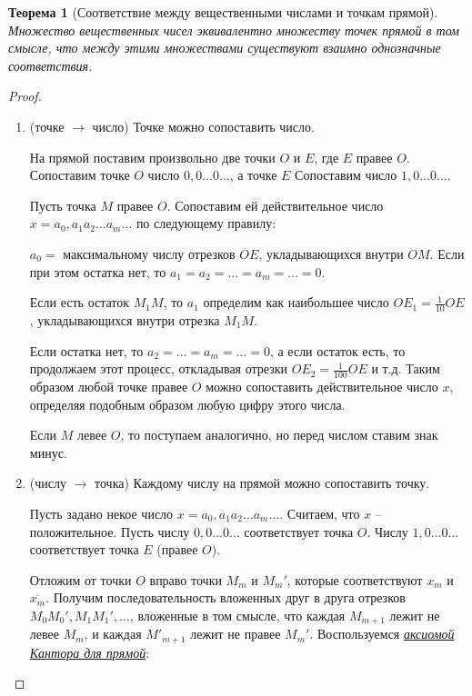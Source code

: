\documentclass[a4paper,oneside]{article}
\newtheorem{theorem}{Теорема}[subsection]
\theoremstyle{definition}
\theoremstyle{definition}
\theoremstyle{definition}
\begin{document}
\begin{theorem}[Соответствие между вещественными числами и точкам прямой]
    Множество вещественных чисел эквивалентно множеству точек прямой в том смысле, что
    между этими множествами существуют взаимно однозначные соответствия.
\end{theorem}
\begin{proof}
    \begin{enumerate}
        \item 
            (точке $\rightarrow$ число) Точке можно сопоставить число.
        
            На прямой поставим произвольно две точки $O$ и $E$, где $E$ правее $O$.
            Сопоставим точке $O$ число $0,0 \dots 0 \dots$, а точке $E$
            Сопоставим число $1,0 \dots 0 \dots$.
            
            Пусть точка $M$ правее $O$. Сопоставим ей действительное число
            $x = a_0,a_1 a_2 \dots a_m \dots$ по следующему правилу:
            
            $a_0 = $ максимальному числу отрезков $OE$, укладывающихся внутри $OM$.
            Если при этом остатка нет, то $a_1 = a_2 = \dots = a_m = \dots = 0$.
            
            Если есть остаток $M_1M$, то $a_1$ определим как наибольшее число
            $OE_1 = \frac{1}{10}OE$, укладывающихся внутри отрезка $M_1M$.
            
            Если остатка нет, то $a_2 = \dots = a_m = \dots = 0$, а если остаток есть,
            то продолжаем этот процесс, откладывая отрезки $OE_2 = \frac{1}{100}OE$ 
            и т.д. Таким образом любой точке правее $O$ можно сопоставить действительное
            число $x$, определяя подобным образом любую цифру этого числа.
            
            Если $M$ левее $O$, то поступаем аналогично, но перед числом ставим знак минус.
    
        \item 
            (числу $\rightarrow$ точка) Каждому числу на прямой можно сопоставить точку.
        
            Пусть задано некое число $x = a_0,a_1 a_2 \dots a_m \dots$. Считаем, что
            $x$ -- положительное. Пусть числу $0,0 \dots 0 \dots$ соответствует точка $O$.
            Числу $1,0 \dots 0 \dots$ соответствует точка $E$ (правее $O$).
            
            Отложим от точки $O$ вправо точки $M_m$ и $M_m'$, которые соответствуют
            $x_m$ и $\overline{x_m}$. Получим последовательность вложенных друг в друга
            отрезков $M_0M_0', M_1M_1', \dots$, вложенные в том смысле, что каждая
            $M_{m+1}$ лежит не левее $M_m$, и каждая $M'_{m+1}$ лежит
            не правее $M_m'$. Воспользуемся \underline{\textit{аксиомой Кантора для прямой}}:
            

\end{enumerate}
\end{proof}
\end{document}
